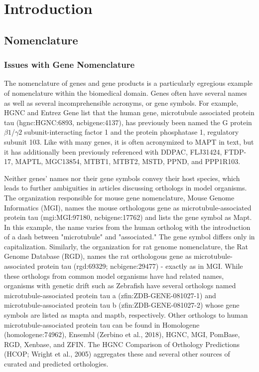 \chapter{Introduction}

\section{Nomenclature}

\subsection{Issues with Gene Nomenclature}

The nomenclature of genes and gene products is a particularly egregious example of nomenclature within the biomedical domain. Genes often have several names as well as several incomprehensible acronyms, or gene symbols. For example, HGNC and Entrez Gene list that the human gene, microtubule associated protein tau (hgnc:HGNC:6893, ncbigene:4137), has previously been named the G protein $\beta1$/$\gamma2$ subunit-interacting factor 1 and the protein phosphatase 1, regulatory subunit 103. Like with many genes, it is often acronymized to MAPT in text, but it has additionally been previously referenced with DDPAC, FLJ31424, FTDP-17, MAPTL, MGC13854, MTBT1, MTBT2, MSTD, PPND, and PPP1R103.

Neither genes' names nor their gene symbols convey their host species, which leads to further ambiguities in articles discussing orthologs in model organisms. The organization responsible for mouse gene nomenclature, Mouse Genome Informatics (MGI), names the mouse orthologous gene as microtubule-associated protein tau (mgi:MGI:97180, ncbigene:17762) and lists the gene symbol as Mapt. In this example, the name varies from the human ortholog with the introduction of a dash between "microtubule" and "associated." The gene symbol differs only in capitalization. Similarly, the organization for rat genome nomenclature, the Rat Genome Database (RGD), names the rat orthologous gene as microtubule-associated protein tau (rgd:69329; ncbigene:29477) - exactly as in MGI. While these orthologs from common model organisms have had related names, organisms with genetic drift such as Zebrafish have several orthologs named microtubule-associated protein tau a (zfin:ZDB-GENE-081027-1) and microtubule-associated protein tau b (zfin:ZDB-GENE-081027-2) whose gene symbols are listed as mapta and maptb, respectively. Other orthologs to human microtubule-associated protein tau can be found in Homologene (homologene:74962), Ensembl (Zerbino et al., 2018), HGNC, MGI, PomBase, RGD, Xenbase, and ZFIN. The HGNC Comparison of Orthology Predictions (HCOP; Wright et al., 2005) aggregates these and several other sources of curated and predicted orthologies.

